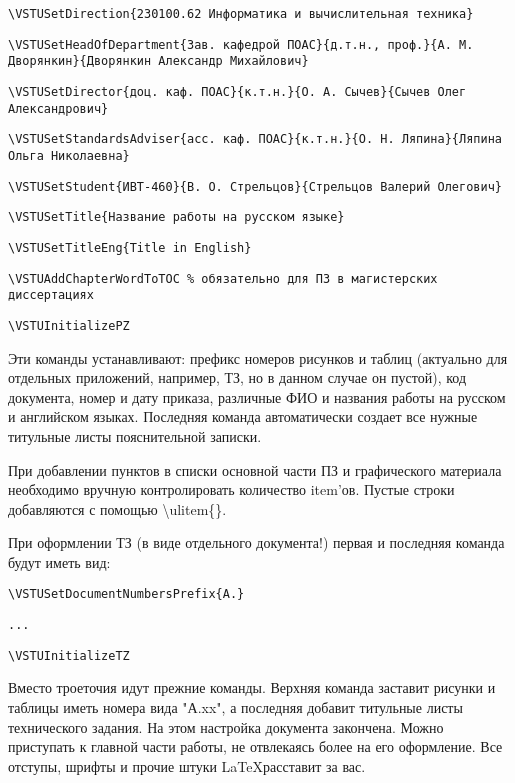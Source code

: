 \documentclass[a4paper,english]{G2-105}
\begin{document}
\texttt{\scriptsize{}\textbackslash{}VSTUSetDirection\{230100.62 Информатика и вычислительная техника\}}

\texttt{\scriptsize{}\textbackslash{}VSTUSetHeadOfDepartment\{Зав. кафедрой ПОАС\}\{д.т.н., проф.\}\{А. М. Дворянкин\}\{Дворянкин Александр Михайлович\}}

\texttt{\scriptsize{}\textbackslash{}VSTUSetDirector\{доц. каф. ПОАС\}\{к.т.н.\}\{О. А. Сычев\}\{Сычев Олег Александрович\}}

\texttt{\scriptsize{}\textbackslash{}VSTUSetStandardsAdviser\{асс. каф. ПОАС\}\{к.т.н.\}\{О. Н. Ляпина\}\{Ляпина Ольга Николаевна\}}

\texttt{\scriptsize{}\textbackslash{}VSTUSetStudent\{ИВТ-460\}\{В. О. Стрельцов\}\{Стрельцов Валерий Олегович\}}

\texttt{\scriptsize{}\textbackslash{}VSTUSetTitle\{Название работы на русском языке\}}

\texttt{\scriptsize{}\textbackslash{}VSTUSetTitleEng\{Title in English\}}

\texttt{\scriptsize{}\textbackslash{}VSTUAddChapterWordToTOC \% обязательно для ПЗ в магистерских диссертациях}

\texttt{\scriptsize{}\textbackslash{}VSTUInitializePZ}

%

Эти команды устанавливают: префикс номеров рисунков и таблиц (актуально для отдельных приложений, например, ТЗ, но в данном случае он пустой), код документа, номер и дату приказа, различные ФИО и названия работы на русском и английском языках. Последняя команда автоматически создает все нужные титульные листы пояснительной записки.

При добавлении пунктов в списки основной части ПЗ и графического материала необходимо вручную контролировать количество item'ов. Пустые строки добавляются с помощью \textbackslash{}ulitem\{\}.

При оформлении ТЗ (в виде отдельного документа!) первая и последняя команда будут иметь вид:

%

\texttt{\scriptsize{}\textbackslash{}VSTUSetDocumentNumbersPrefix\{А.\}}

\texttt{\scriptsize{}...}

\texttt{\scriptsize{}\textbackslash{}VSTUInitializeTZ}

%

Вместо троеточия идут прежние команды. Верхняя команда заставит рисунки и таблицы иметь номера вида "{}А.xx"{}, а последняя добавит титульные листы технического задания. На этом настройка документа закончена. Можно приступать к главной части работы, не отвлекаясь более на его оформление. Все отступы, шрифты и прочие штуки \LaTeX расставит за вас.
\end{document}
